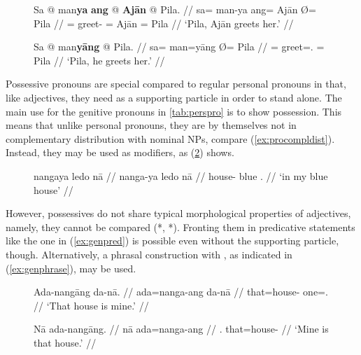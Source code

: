 \begin{figure}[h]
\pex\label{ex:agtproclt}
\a\label{ex:agtproclt_1}%
\begingl
	\gla Sa @ man\textbf{ya} \textbf{ang} @ \textbf{Ajān} {} @ Pila. //
	\glb sa= man-ya ang= ​Ajān Ø= ​Pila //
	\glc \PatT{}= greet-\TsgM{} \Aarg{}= ​Ajān \Top{}= ​Pila //
	\glft `Pila, Ajān greets her.' //
\endgl

\a\label{ex:agtproclt_2}%
\begingl
	\gla Sa @ man\textbf{yāng} {} @ Pila. //
	\glb sa= man=yāng Ø= ​Pila //
	\glc \PatT{}= greet=\TsgM{}.\Aarg{} \Top{}= Pila //
	\glft `Pila, he greets her.' //
\endgl
\xe
\end{figure}


\label{phsec:possadj}
Possessive pronouns are special compared to regular personal pronouns in that,
like adjectives, they need  as a supporting particle in order to
stand alone. The main use for the genitive pronouns in \autoref{tab:perspro} is
to show possession. This means that unlike personal pronouns, they are by
themselves not in complementary distribution with nominal NPs, compare
(\ref{ex:procompldist}). Instead, they may be used as modifiers, as
(\ref{ex:adjgen}) shows.

\begin{figure}[h]
\ex\label{ex:adjgen}%
\begingl
	\gla nangaya ledo nā //
	\glb nanga-ya ledo nā //
	\glc house-\Loc{} blue \Fsg{}.\Gen{} //
	\glft `in my blue house' //
\endgl
\xe
\end{figure}

However, possessives do not share typical morphological properties of
adjectives, namely, they cannot be compared (*,
*). Fronting them in predicative statements like
the one in (\ref{ex:genpred}) is possible even without the supporting particle,
though. Alternatively, a phrasal construction with
, as indicated in (\ref{ex:genphrase}), may be
used.

\begin{figure}[h]
\pex\label{ex:genpred}
\a\label{ex:genpred_1}\begingl
	\gla Ada-nangāng da-nā. //
	\glb ada=nanga-ang da-nā //
	\glc that=house-\Aarg{} one=\Fsg{}.\Gen{} //
	\glft `That house is mine.' //
\endgl

\a\label{ex:genpred_2}\begingl
	\gla Nā ada-nangāng. //
	\glb nā ada=nanga-ang //
	\glc \Fsg{}.\Gen{} that=house-\Aarg{} //
	\glft `Mine is that house.' //
\endgl
\xe
\end{figure}

